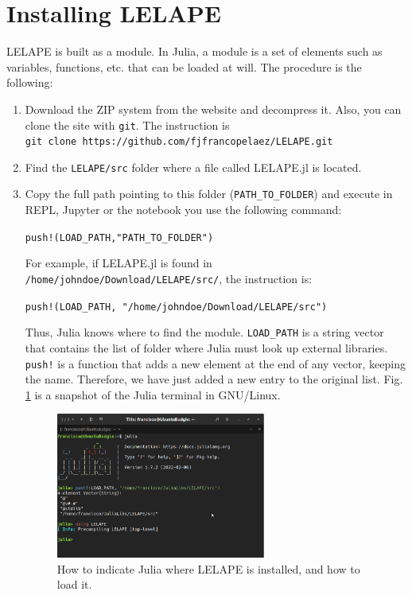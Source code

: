 \section{Installing LELAPE}
%
LELAPE is built as a module. In Julia, a module is a set of elements such as variables, functions, etc. that can be loaded at will. The procedure is the following:
%
\begin{enumerate}
	\item Download the ZIP system from the website and decompress it. Also, you can clone the site with \texttt{git}. The instruction is \\ \texttt{git clone https://github.com/fjfrancopelaez/LELAPE.git}
	\item Find the \texttt{LELAPE/src} folder where a file called LELAPE.jl is located.
	\item Copy the full path pointing to this folder (\texttt{PATH\_TO\_FOLDER}) and execute in REPL, Jupyter or the notebook you use the following command:
	
	\vspace{1mm}
	\begin{center}
		\texttt{{push!(LOAD\_PATH,"PATH\_TO\_FOLDER")}}
	\end{center}
	\vspace{1mm}	
	
	For example, if LELAPE.jl is found in \texttt{/home/johndoe/Download/LELAPE/src/}, the instruction is:
		
	\vspace{1mm}
	\begin{center}
		\texttt{push!(LOAD\_PATH, "/home/johndoe/Download/LELAPE/src")}
	\end{center}
	\vspace{1mm}	
	
	Thus, Julia knows where to find the module. \texttt{LOAD\_PATH} is a string vector that contains the list of folder where Julia must look up external libraries. \texttt{push!} is a function that adds a new element at the end of any vector, keeping the name. Therefore, we have just added a new entry to the original list.	Fig. \ref{Fig:Loading_LELAPE} is a snapshot of the Julia terminal in GNU/Linux.
	\begin{figure}
		\centering
		
		\includegraphics[width=0.65\textwidth]{fig/Loading_LELAP.png}
		\caption{How to indicate Julia where LELAPE is installed, and how to load it.}
		\label{Fig:Loading_LELAPE}
	\end{figure}
	

\end{enumerate}
